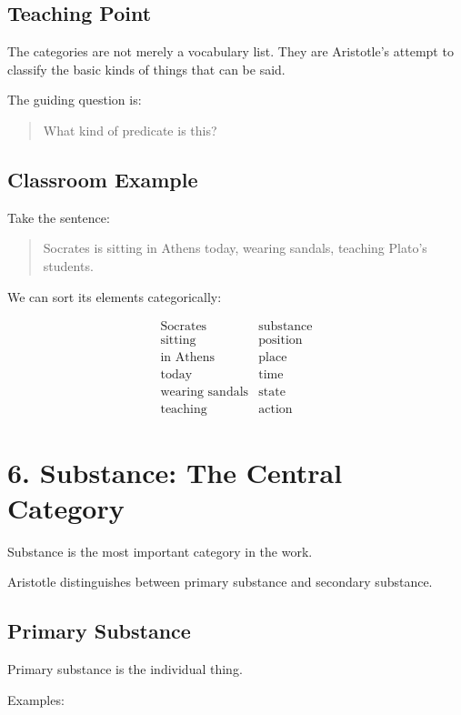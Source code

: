 \documentclass[12pt]{article}
\begin{document}
\subsection*{Teaching Point}

The categories are not merely a vocabulary list. They are Aristotle's attempt
to classify the basic kinds of things that can be said.

The guiding question is:

\begin{quote}
What kind of predicate is this?
\end{quote}

\subsection*{Classroom Example}

Take the sentence:

\begin{quote}
Socrates is sitting in Athens today, wearing sandals, teaching Plato's students.
\end{quote}

We can sort its elements categorically:

\[
\begin{array}{ll}
\text{Socrates} & \text{substance} \\
\text{sitting} & \text{position} \\
\text{in Athens} & \text{place} \\
\text{today} & \text{time} \\
\text{wearing sandals} & \text{state} \\
\text{teaching} & \text{action}
\end{array}
\]

\section*{6. Substance: The Central Category}

Substance is the most important category in the work.

Aristotle distinguishes between primary substance and secondary substance.

\subsection*{Primary Substance}

Primary substance is the individual thing.

Examples:
\end{document}
